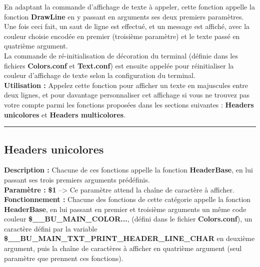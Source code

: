\documentclass[a4paper,10pt]{article}
\begin{document}
En adaptant la commande d'affichage de texte à appeler, cette fonction appelle la fonction \color{mauve}\textbf{DrawLine }\color{white} en y passant en arguments ses deux premiers paramètres.\\[1\baselineskip]

Une fois ceci fait, un saut de ligne est effectué, et un message est affiché, avec la couleur choisie\linebreak
encodée en premier (troisième paramètre) et le texte passé en quatrième argument.\\[1\baselineskip]

La commande de ré-initialisation de décoration du terminal (définie dans les fichiers \color{lime}\textbf{Colors.conf }\color{white} et \color{lime}\textbf{Text.conf}\color{white}) est ensuite appelée pour réinitialiser la couleur d'affichage de texte selon la configuration du terminal.\\[1\baselineskip]

\textbf{Utilisation :}\linebreak
Appelez cette fonction pour afficher un texte en majuscules entre deux lignes, et pour davantage\linebreak
personnaliser cet affichage si vous ne trouvez pas votre compte parmi les fonctions proposées dans les sections suivantes :
\color{green}\textbf{Headers unicolores }\color{white} et \color{green}\textbf{Headers multicolores}\color{white}.\\[1\baselineskip]


\color{green}\par\noindent\rule{\textwidth}{0.4pt}\color{white}

\color{green}
\subsection{Headers unicolores}\color{white}
\textbf{Description :}\linebreak
Chacune de ces fonctions appelle la fonction \color{mauve}\textbf{HeaderBase}\color{white}, en lui passant ses trois premiers\linebreak
arguments prédéfinis.\\[1\baselineskip]

\textbf{Paramètre :}\linebreak
\color{orange}\textbf{\$1 }\color{white} --> Ce paramètre attend la chaîne de caractère à afficher.\\[1\baselineskip]


\textbf{Fonctionnement :}\linebreak
Chacune des fonctions de cette catégorie appelle la fonction \color{mauve}\textbf{HeaderBase}\color{white}, en lui passant en premier et troisième arguments un même code couleur \color{orange}\textbf{\$\_\_BU\_MAIN\_COLOR...}\color{white}, (défini dans le fichier \color{lime}\textbf{Colors.conf}\color{white}), un caractère défini par la variable \color{orange}\textbf{\$\_\_BU\_MAIN\_TXT\_PRINT\_HEADER\_LINE\_CHAR }\color{white} en deuxième\linebreak
argument, puis la chaîne de caractères à afficher en quatrième argument (seul paramètre que prennent ces fonctions).\\[1\baselineskip]
\end{document}

